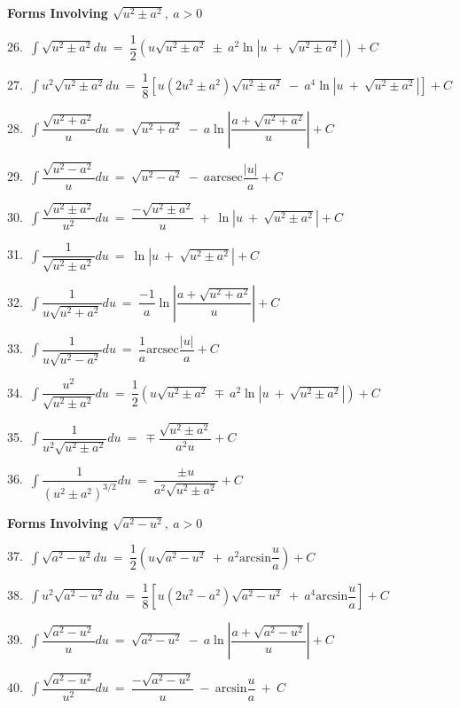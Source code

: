 \documentclass{article}
\begin{document}
\begin{large}
\begin{small}
\textbf{Forms Involving $\sqrt{u^{2}\pm a^{2}},\ a>0$}

26.\ $\displaystyle\int \sqrt{u^{2}\pm a^{2}}du\ =\ \dfrac{1}{2}(u\sqrt{u^{2}\pm a^{2}}\ \pm\ a^{2}\ln|u\ +\ \sqrt{u^{2}\pm a^{2}}|) + C$

27.\ $\displaystyle\int u^{2}\sqrt{u^{2}\pm a^{2}}du\ =\ \dfrac{1}{8}[u(2u^{2}\pm a^{2})\sqrt{u^{2}\pm a^{2}}\ -\ a^{4}\ln|u\ +\ \sqrt{u^{2}\pm a^{2}}|] + C$

28.\ $\displaystyle\int \dfrac{\sqrt{u^{2}+a^{2}}}{u}du\ =\ \sqrt{u^{2}+a^{2}}\ -\ a\ln\left|\dfrac{a+\sqrt{u^{2}+a^{2}}}{u}\right| + C$

29.\ $\displaystyle\int \dfrac{\sqrt{u^{2}-a^{2}}}{u}du\ =\ \sqrt{u^{2}-a^{2}}\ -\ a\text{arcsec}\dfrac{|u|}{a} + C$

30.\ $\displaystyle\int \dfrac{\sqrt{u^{2}\pm a^{2}}}{u^{2}}du\ =\ \dfrac{-\sqrt{u^{2}\pm a^{2}}}{u}\ +\ \ln|u\ +\ \sqrt{u^{2}\pm a^{2}}| + C$

31.\ $\displaystyle\int \dfrac{1}{\sqrt{u^{2}\pm a^{2}}}du\ =\ \ln|u\ +\ \sqrt{u^{2}\pm a^{2}}| + C$

32.\ $\displaystyle\int \dfrac{1}{u\sqrt{u^{2}+a^{2}}}du\ =\ \dfrac{-1}{a}\ln\left|\dfrac{a+\sqrt{u^{2}+a^{2}}}{u}\right| + C$

33.\ $\displaystyle\int \dfrac{1}{u\sqrt{u^{2}-a^{2}}}du\ =\ \dfrac{1}{a}\text{arcsec}\dfrac{|u|}{a} + C$

34.\ $\displaystyle\int \dfrac{u^{2}}{\sqrt{u^{2}\pm a^{2}}}du\ =\ \dfrac{1}{2}(u\sqrt{u^{2}\pm a^{2}}\ \mp\ a^{2}\ln|u\ +\ \sqrt{u^{2}\pm a^{2}}|) + C$

35.\ $\displaystyle\int \dfrac{1}{u^{2}\sqrt{u^{2}\pm a^{2}}}du\ =\ \mp\dfrac{\sqrt{u^{2}\pm a^{2}}}{a^{2}u} + C$

36.\ $\displaystyle\int \dfrac{1}{(u^{2}\pm a^{2})^{3/2}}du\ =\ \dfrac{\pm u}{a^{2}\sqrt{u^{2}\pm a^{2}}} + C$

\textbf{Forms Involving $\sqrt{a^{2}-u^{2}},\ a>0$}

37.\ $\displaystyle\int \sqrt{a^{2}-u^{2}}du\ =\ \dfrac{1}{2}\left(u\sqrt{a^{2}-u^{2}}\ +\ a^{2}\text{arcsin}\dfrac{u}{a}\right) + C$

38.\ $\displaystyle\int u^{2}\sqrt{a^{2}-u^{2}}du\ =\ \dfrac{1}{8}\left[u(2u^{2}-a^{2})\sqrt{a^{2}-u^{2}}\ +\ a^{4}\text{arcsin}\dfrac{u}{a}\right] + C$

39.\ $\displaystyle\int \dfrac{\sqrt{a^{2}-u^{2}}}{u}du\ =\ \sqrt{a^{2}-u^{2}}\ -\ a\ln\left|\dfrac{a+\sqrt{a^{2}-u^{2}}}{u}\right| + C$

40.\ $\displaystyle\int \dfrac{\sqrt{a^{2}-u^{2}}}{u^{2}}du\ =\ \dfrac{-\sqrt{a^{2}-u^{2}}}{u}\ -\ \text{arcsin}\dfrac{u}{a}\ +\ C$


\end{small}
\end{large}
\end{document}
